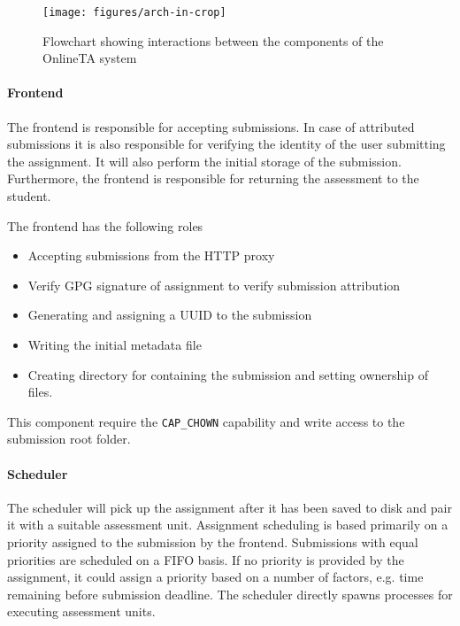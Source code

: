 \begin{figure}
\centering
\texttt{[image: figures/arch-in-crop]}

\caption{Flowchart showing interactions between the components of the
  OnlineTA system}
\label{fig:arch}
\end{figure}

\paragraph{Frontend}
The frontend is responsible for accepting submissions. In case of
attributed submissions it is also responsible for verifying the
identity of the user submitting the assignment. It will also perform
the initial storage of the submission. Furthermore, the frontend is
responsible for returning the assessment to the student.


The frontend has the following roles
\begin{itemize}
\item Accepting submissions from the HTTP proxy
\item Verify GPG signature of assignment to verify submission
  attribution
\item Generating and assigning a UUID to the submission
\item Writing the initial metadata file
\item Creating directory for containing the submission and setting
  ownership of files.
\end{itemize}

This component require the \texttt{CAP\_CHOWN} capability and write
access to the submission root folder.

\paragraph{Scheduler}
The scheduler will pick up the assignment after it has been saved to
disk and pair it with a suitable assessment unit. Assignment
scheduling is based primarily on a priority assigned to the submission
by the frontend. Submissions with equal priorities are scheduled on a
FIFO basis. If no priority is provided by the assignment, it could
assign a priority based on a number of factors, e.g. time remaining
before submission deadline. The scheduler directly spawns processes for
executing assessment units.

